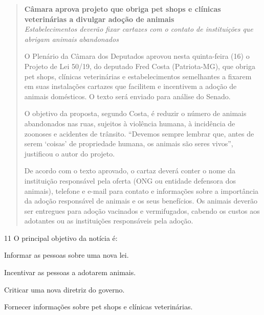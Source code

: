 \begin{quote}
\centering\noindent\textbf{Câmara aprova projeto que obriga pet shops e clínicas veterinárias a
divulgar adoção de animais}\\

\centering\noindent \emph{Estabelecimentos deverão fixar cartazes com o contato de
instituições que abrigam animais abandonados}\\
\medskip


\noindent O Plenário da Câmara dos Deputados aprovou nesta quinta-feira (16) o
Projeto de Lei 50/19, do deputado Fred Costa (Patriota-MG), que obriga
pet shops, clínicas veterinárias e estabelecimentos semelhantes a
fixarem em suas instalações cartazes que facilitem e incentivem a adoção
de animais domésticos. O texto será enviado para análise do Senado.

O objetivo da proposta, segundo Costa, é reduzir o número de animais
abandonados nas ruas, sujeitos à violência humana, à incidência de
zoonoses e acidentes de trânsito. ``Devemos sempre lembrar que, antes de
serem `coisas' de propriedade humana, os animais são seres vivos'',
justificou o autor do projeto.

De acordo com o texto aprovado, o cartaz deverá conter o nome da
instituição responsável pela oferta (ONG ou entidade defensora dos
animais), telefone e e-mail para contato e informações sobre a
importância da adoção responsável de animais e os seus benefícios. Os
animais deverão ser entregues para adoção vacinados e vermifugados,
cabendo os custos aos adotantes ou as instituições responsáveis pela
adoção.

\end{quote}

\num{11} O principal objetivo da notícia é:

\begin{escolha}
\item
  Informar as pessoas sobre uma nova lei.
\item
  Incentivar as pessoas a adotarem animais.
\item
  Criticar uma nova diretriz do governo.
\item
  Fornecer informações sobre pet shops e clínicas veterinárias.
\end{escolha}

